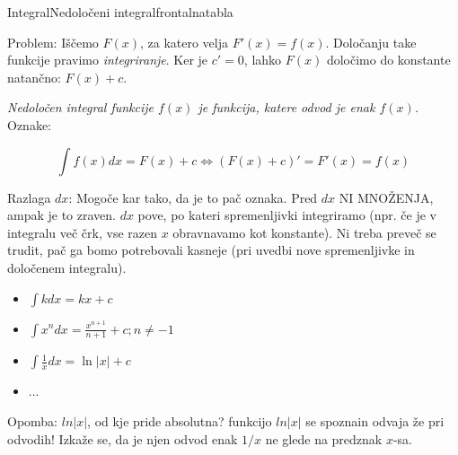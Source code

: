 \begin{priprava}{}{}{Integral}{Nedoločeni integral}{frontalna}{tabla}

  

Problem: Iščemo $ F(x) $, za katero velja $ F'(x) = f(x) $. Določanju take funkcije pravimo \emph{integriranje}.  Ker je $ c' = 0 $, lahko $ F(x) $ določimo do konstante natančno: $ F(x) + c $.


\emph{Nedoločen integral funkcije $ f(x) $ je funkcija, katere odvod je enak $ f(x) $.} Oznake:

$$ \int f(x) dx = F(x) + c \Longleftrightarrow (F(x) + c)' = F'(x) = f(x) $$ 

\textcolor{rdeca}{Razlaga $ dx $:} Mogoče kar tako, da je to pač oznaka. Pred $ dx $ NI MNOŽENJA, ampak je to zraven. $ dx $ pove, po kateri spremenljivki integriramo (npr. če je v integralu več črk, vse razen $ x $ obravnavamo kot konstante). Ni treba preveč se trudit, pač ga bomo potrebovali kasneje (pri uvedbi nove spremenljivke in določenem integralu).



\begin{itemize}
    \item $ \int k dx = kx + c $
    \item $ \int x^n dx = \frac{x^{n+1}}{n + 1} + c; n \ne -1 $
    \item $ \int \frac{1}{x} dx = \ln |x| + c $
    \item ...
\end{itemize}

Opomba: $ ln|x| $, od kje pride absolutna? \textcolor{rdeca}{funkcijo $ ln |x| $ se spoznain odvaja že pri odvodih! Izkaže se, da je njen odvod enak $ 1/x $ ne glede na predznak $ x $-sa.}


\end{priprava}
